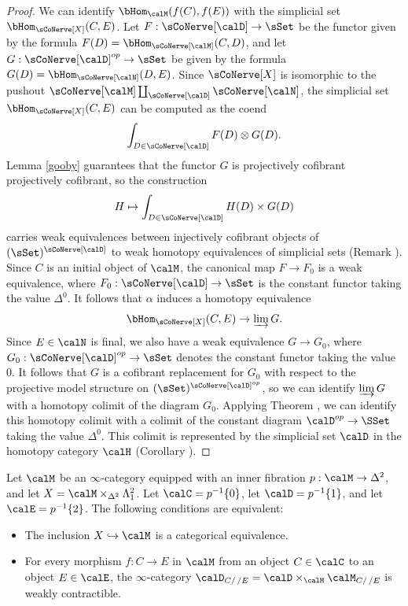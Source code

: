 \begin{proof}
We can identify $\bHom_{\calM}( f(C), f(E))$ with the simplicial set
$\bHom_{ \sCoNerve[X]}(C,E)$. Let $F: \sCoNerve[ \calD] \rightarrow \sSet$
be the functor given by the formula $F(D) = \bHom_{ \sCoNerve[\calM]}(C,D)$, and let
$G: \sCoNerve[\calD]^{op} \rightarrow \sSet$ be given by the formula
$G(D) = \bHom_{ \sCoNerve[\calN]}(D, E)$. Since $\sCoNerve[X]$ is isomorphic to the pushout
$\sCoNerve[ \calM] \coprod_{ \sCoNerve[\calD] } \sCoNerve[\calN]$, the simplicial set
$\bHom_{ \sCoNerve[X]}(C,E)$ can be computed as the coend
$$ \int_{ D \in \sCoNerve[\calD] } F(D) \otimes G(D).$$
Lemma \ref{gooby} guarantees that the functor $G$ is projectively cofibrant
projectively cofibrant, so the construction
$$ H \mapsto \int_{D \in \sCoNerve[\calD]} H(D) \times G(D)$$
carries weak equivalences between injectively cofibrant objects 
of $(\sSet)^{ \sCoNerve[\calD]}$ to weak homotopy equivalences of simplicial sets (Remark ). Since $C$ is an initial object of $\calM$, the canonical map
$F \rightarrow F_0$ is a weak equivalence, where $F_0: \sCoNerve[\calD] \rightarrow \sSet$ is
the constant functor taking the value $\Delta^0$. It follows that $\alpha$ induces a homotopy equivalence
$$ \bHom_{ \sCoNerve[X]}(C,E) \rightarrow \varinjlim G.$$
Since $E \in \calN$ is final, we also have a weak equivalence
$G \rightarrow G_0$, where $G_0: \sCoNerve[ \calD]^{op} \rightarrow \sSet$ denotes
the constant functor taking the value $0$. It follows that $G$ is a cofibrant
replacement for $G_0$ with respect to the projective model structure on
$(\sSet)^{ \sCoNerve[\calD]^{op} }$, so we can identify $\varinjlim G$ with
a homotopy colimit of the diagram $G_0$. Applying Theorem , we
can identify this homotopy colimit with a colimit of the constant diagram
$\calD^{op} \rightarrow \SSet$ taking the value $\Delta^0$. This colimit
is represented by the simplicial set $\calD$ in the homotopy category $\calH$
(Corollary ).
\end{proof}

\begin{proposition}\label{seda}
Let $\calM$ be an $\infty$-category equipped with an inner fibration
$p: \calM \rightarrow \Delta^2$, and let $X = \calM \times_{ \Delta^2} \Lambda^2_1$.
Let $\calC = p^{-1} \{0\}$, let $\calD = p^{-1} \{1\}$, and let $\calE = p^{-1} \{2\}$. 
The following conditions are equivalent:
\begin{itemize}
\item[$(1)$] The inclusion $X \hookrightarrow \calM$ is a categorical equivalence.
\item[$(2)$] For every morphism $f: C \rightarrow E$ in $\calM$ from an
object $C \in \calC$ to an object $E \in \calE$, the $\infty$-category
$\calD_{C/ \, /E} = \calD \times_{ \calM} \calM_{ C/ \, /E}$ is weakly contractible.
\end{itemize}
\end{proposition}

